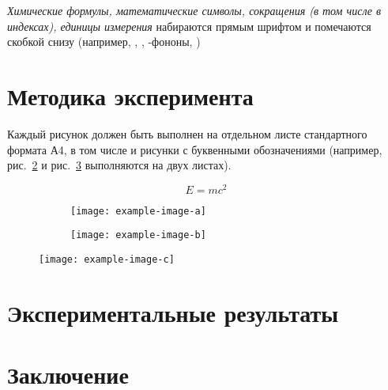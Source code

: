 \documentclass[14pt]{extarticle}
\begin{document}
\textit{Химические формулы, математические символы, сокращения (в том числе в 
индексах), единицы измерения} набираются прямым шрифтом и помечаются скобкой 
снизу (например, , \ph{$\cos$}, -фононы, 
\ph{\si{\eV}})
\section{Методика эксперимента}

Каждый рисунок должен быть выполнен на отдельном листе стандартного формата А4,
в том числе и рисунки с буквенными обозначениями (например, рис.~\ref{fig1} и рис.~\ref{fig2} выполняются на двух листах).

\begin{equation}
E = mc^2
\label{eq:1}
\end{equation}


\begin{figure}
	\centering
	\begin{subfigure}[]{80mm}
		\texttt{[image: example-image-a]}
		\caption[]{\label{fig1}}
	\end{subfigure}
	\caption[]{}
\end{figure}

\begin{figure}
	\ContinuedFloat
	\centering
	\begin{subfigure}[]{80mm}

		\texttt{[image: example-image-b]}
		\caption[]{\label{fig2}}
	\end{subfigure}
	\caption[Название рисунка, которое будет выводиться в списке иллюстраций]{\label{fig}}
\end{figure}

\begin{figure}
	\centering
	\texttt{[image: example-image-c]}
	\caption[Название второго рисунка]{\label{fig3}}
\end{figure}

\section{Экспериментальные результаты}

\section{Заключение}

\newpage


\end{document}
